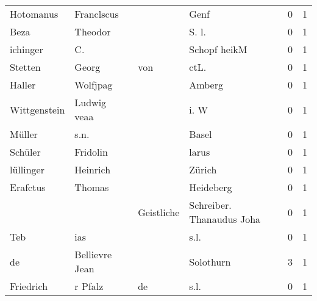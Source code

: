 \documentclass[10pt,a4paper,landscape]{article}
\begin{document}
\begin{longtable}{llllrr}
                Hotomanus &                         Franclscus &             &                                        Genf &          0 &         1 \\
                     Beza &                            Theodor &             &                                      S. l.  &          0 &         1 \\
                 ichinger &                                 C. &             &                                Schopf heikM &          0 &         1 \\
                  Stetten &                              Georg &         von &                                       ctL.  &          0 &         1 \\
                   Haller &                           Wolfjpag &             &                                      Amberg &          0 &         1 \\
             Wittgenstein &                        Ludwig veaa &             &                                        i. W &          0 &         1 \\
                   Müller &                               s.n. &             &                                       Basel &          0 &         1 \\
                  Schüler &                           Fridolin &             &                                       larus &          0 &         1 \\
                lüllinger &                           Heinrich &             &                                      Zürich &          0 &         1 \\
                 Erafctus &                             Thomas &             &                                   Heideberg &          0 &         1 \\
                          &                                    &  Geistliche &                   Schreiber. Thanaudus Joha &          0 &         1 \\
                      Teb &                                ias &             &                                        s.l. &          0 &         1 \\
                       de &                     Bellievre Jean &             &                                   Solothurn &          3 &         1 \\
                Friedrich &                            r Pfalz &          de &                                        s.l. &          0 &         1 \\

\end{longtable}
\end{document}
